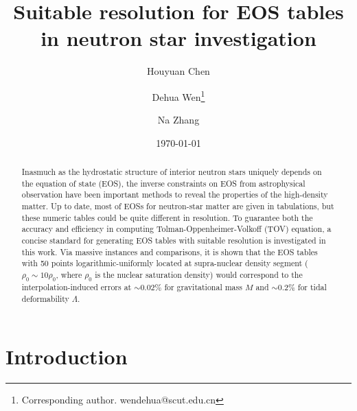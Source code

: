 \documentclass[aps,prl,a4paper,twocolumn,floats,amsmath,amssymb,nofootinbib,showpacs]{revtex4-1}
\begin{document}
\title{Suitable resolution for EOS tables in neutron star investigation}

\author{Houyuan Chen}

\author{Dehua Wen\footnote{Corresponding author. wendehua@scut.edu.cn}}

\author{Na Zhang}

\date{\today}


\begin{abstract}
Inasmuch as the hydrostatic structure of interior neutron stars uniquely depends on the equation of state (EOS), the inverse constraints on EOS from astrophysical observation have been important methods to reveal the properties of the high-density matter. Up to date, most of EOSs for neutron-star matter are given in tabulations, but these numeric tables could be quite different in resolution. To guarantee both the accuracy and efficiency in computing Tolman-Oppenheimer-Volkoff (TOV) equation, a concise standard for generating EOS tables with suitable resolution is investigated in this work. Via massive instances and comparisons, it is shown that the EOS tables with 50 points logarithmic-uniformly located at supra-nuclear density segment ( $\rho_{0} \sim 10 \rho_{0} $, where $\rho_{0}$ is the nuclear saturation density) would correspond to the interpolation-induced errors at $\sim 0.02\%$ for gravitational mass $M$ and $\sim 0.2\%$ for tidal deformability $\Lambda$.

\end{abstract}



\maketitle


\section{Introduction}
\end{document}
